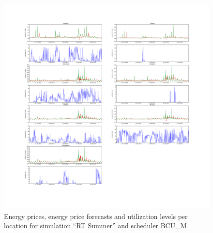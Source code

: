 \begin{figure}[htbp]
	\centering
	\vspace*{-0.6in}
	\hspace*{-1.4in}
		\includegraphics[width=1.60\textwidth]{figures/appendix_simulation_results/RT_Summer_scenario_5.pdf}
	\vspace*{-1.0in}
	\caption{Energy prices, energy price forecasts and utilization levels per location for simulation ``RT Summer'' and scheduler BCU\_M}
	\label{fig:app_RT_Summer_scenario_5}
\end{figure}

